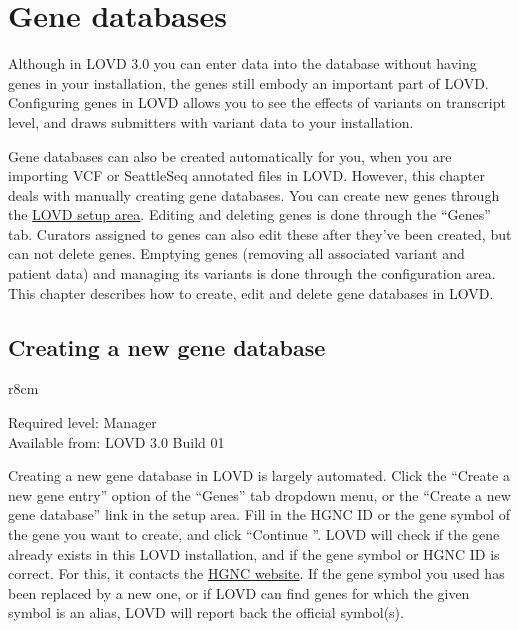 \chapter{Gene databases}
Although in LOVD 3.0 you can enter data into the database without having genes in your installation, the genes still embody an important part of LOVD.
Configuring genes in LOVD allows you to see the effects of variants on transcript level, and draws submitters with variant data to your installation.

Gene databases can also be created automatically for you, when you are importing VCF or SeattleSeq annotated files in LOVD.
However, this chapter deals with manually creating gene databases.
You can create new genes through the \hyperlink{chap:setup}{LOVD setup area}.
Editing and deleting genes is done through the ``Genes'' tab.
Curators assigned to genes can also edit these after they've been created, but can not delete genes.
Emptying genes (removing all associated variant and patient data) and managing its variants is done through the configuration area.
This chapter describes how to create, edit and delete gene databases in LOVD.





\hypertarget{sec:gene_create}{}
\section{Creating a new gene database}
\label{sec:gene_create}
\begin{wrapfigure}[3]{r}{8cm} %
  \vspace{-25pt}
  \begin{leftbar}
    Required level: Manager\\
    Available from: LOVD 3.0 Build 01
  \end{leftbar}
\end{wrapfigure}
Creating a new gene database in LOVD is largely automated.
Click the ``Create a new gene entry'' option of the ``Genes'' tab dropdown menu, or the ``Create a new gene database'' link in the setup area.
Fill in the HGNC ID or the gene symbol of the gene you want to create, and click ``Continue \guillemotright''.
LOVD will check if the gene already exists in this LOVD installation, and if the gene symbol or HGNC ID is correct.
For this, it contacts the \href{http://www.genenames.org/}{HGNC website}.
If the gene symbol you used has been replaced by a new one, or if LOVD can find genes for which the given symbol is an alias,
 LOVD will report back the official symbol(s).

